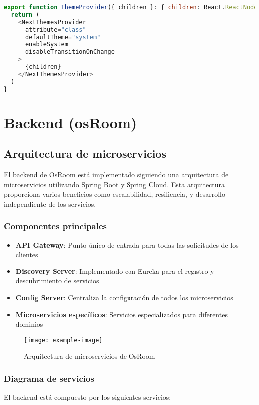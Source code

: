 \documentclass[12pt,a4paper]{report}
\begin{document}
\begin{lstlisting}[language=JavaScript, caption=Configuración del proveedor de temas]
export function ThemeProvider({ children }: { children: React.ReactNode }) {
  return (
    <NextThemesProvider
      attribute="class"
      defaultTheme="system"
      enableSystem
      disableTransitionOnChange
    >
      {children}
    </NextThemesProvider>
  )
}
\end{lstlisting}

\chapter{Backend (osRoom)}
\section{Arquitectura de microservicios}
El backend de OsRoom está implementado siguiendo una arquitectura de microservicios utilizando Spring Boot y Spring Cloud. Esta arquitectura proporciona varios beneficios como escalabilidad, resiliencia, y desarrollo independiente de los servicios.

\subsection{Componentes principales}
\begin{itemize}
    \item \textbf{API Gateway}: Punto único de entrada para todas las solicitudes de los clientes
    \item \textbf{Discovery Server}: Implementado con Eureka para el registro y descubrimiento de servicios
    \item \textbf{Config Server}: Centraliza la configuración de todos los microservicios
    \item \textbf{Microservicios específicos}: Servicios especializados para diferentes dominios
\end{itemize}

\begin{figure}[H]
    \centering
    \texttt{[image: example-image]}
    \caption{Arquitectura de microservicios de OsRoom}
    \label{fig:microservices}
\end{figure}

\subsection{Diagrama de servicios}
El backend está compuesto por los siguientes servicios:
\end{document}
